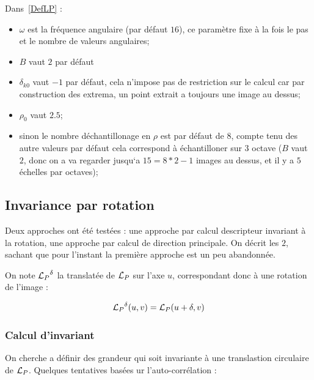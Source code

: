 Dans~\ref{DefLP} :

\begin{itemize}
   \item  $\omega$ est la fr\'equence angulaire (par d\'efaut $16$), ce param\`etre fixe \`a la fois le
          pas et le nombre de valeurs angulaires;
   \item  $B$ vaut $2$ par d\'efaut 
   \item  $\delta_{k0}$ vaut $-1$ par d\'efaut, cela n'impose pas de restriction sur le calcul car
          par construction des extrema, un point extrait a toujours une image au dessus;
   \item  $\rho_0$ vaut $2.5$;
   \item sinon le nombre d\'echantillonage en $\rho$ est par d\'efaut de $8$, compte tenu des autre valeurs
         par d\'efaut cela correspond \`a \'echantilloner sur $3$ octave ($B$ vaut $2$, donc on a 
         va regarder jusqu`a $15=8*2-1$ images au dessus, et il y a $5$ \'echelles par octaves);
\end{itemize}



\subsection{Invariance par rotation}

Deux approches ont \'et\'e test\'ees  : une approche par calcul descripteur
invariant \`a la rotation, une approche par calcul de direction principale.
On d\'ecrit les $2$, sachant que pour l'instant la premi\`ere approche est un
peu abandonn\'ee.

On note ${\mathcal L_P}^\delta$ la translat\'ee de ${\mathcal L_P}$ sur l'axe $u$, correspondant donc \`a une
rotation de l'image :

\begin{equation}
    {\mathcal L_P}^\delta(u,v) = {\mathcal L_P}(u+\delta,v)
\end{equation}


\subsubsection{Calcul d'invariant}

On cherche a d\'efinir des grandeur qui soit invariante \`a une translastion
circulaire de ${\mathcal L_P}$. Quelques tentatives bas\'ees ur l'auto-corr\'elation  :

